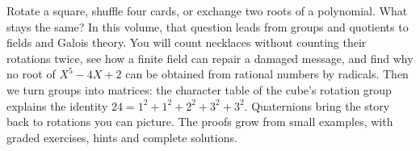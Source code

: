Rotate a square, shuffle four cards, or exchange two roots of a polynomial. What stays the same? In this volume, that question leads from groups and quotients to fields and Galois theory. You will count necklaces without counting their rotations twice, see how a finite field can repair a damaged message, and find why no root of $X^5-4X+2$ can be obtained from rational numbers by radicals. Then we turn groups into matrices: the character table of the cube's rotation group explains the identity $24=1^2+1^2+2^2+3^2+3^2$. Quaternions bring the story back to rotations you can picture. The proofs grow from small examples, with graded exercises, hints and complete solutions.
